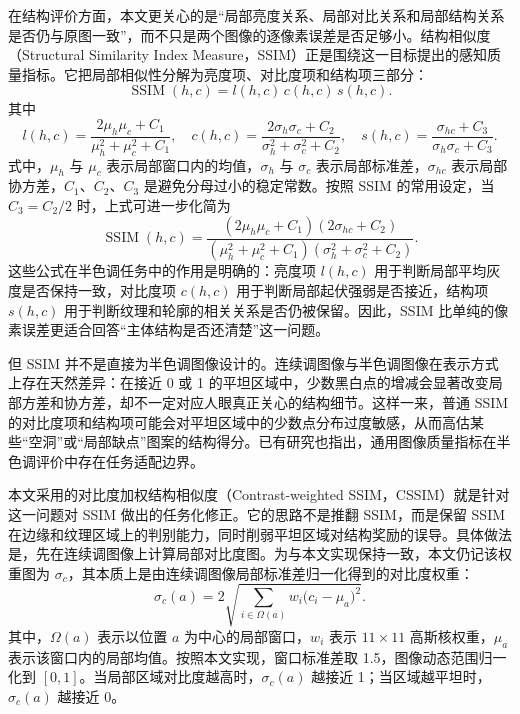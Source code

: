 \documentclass[thesis]{../zstucs-graduation-project}
\begin{document}
在结构评价方面，本文更关心的是“局部亮度关系、局部对比关系和局部结构关系是否仍与原图一致”，而不只是两个图像的逐像素误差是否足够小。结构相似度（Structural Similarity Index Measure，SSIM）正是围绕这一目标提出的感知质量指标\cite{WANG2004Image}。它把局部相似性分解为亮度项、对比度项和结构项三部分：
\begin{equation}
\operatorname{SSIM}(h,c)=l(h,c)\,c(h,c)\,s(h,c).
\label{eq:2-3}
\end{equation}
其中
\begin{equation}
l(h,c)=\frac{2\mu_h\mu_c+C_1}{\mu_h^2+\mu_c^2+C_1},\quad
c(h,c)=\frac{2\sigma_h\sigma_c+C_2}{\sigma_h^2+\sigma_c^2+C_2},\quad
s(h,c)=\frac{\sigma_{hc}+C_3}{\sigma_h\sigma_c+C_3}.
\label{eq:2-4}
\end{equation}
式中，$\mu_h$ 与 $\mu_c$ 表示局部窗口内的均值，$\sigma_h$ 与 $\sigma_c$ 表示局部标准差，$\sigma_{hc}$ 表示局部协方差，$C_1$、$C_2$、$C_3$ 是避免分母过小的稳定常数。按照 SSIM 的常用设定，当 $C_3=C_2/2$ 时，上式可进一步化简为
\begin{equation}
\operatorname{SSIM}(h,c)=
\frac{(2\mu_h\mu_c+C_1)(2\sigma_{hc}+C_2)}{(\mu_h^2+\mu_c^2+C_1)(\sigma_h^2+\sigma_c^2+C_2)}.
\label{eq:2-5}
\end{equation}
这些公式在半色调任务中的作用是明确的：亮度项 $l(h,c)$ 用于判断局部平均灰度是否保持一致，对比度项 $c(h,c)$ 用于判断局部起伏强弱是否接近，结构项 $s(h,c)$ 用于判断纹理和轮廓的相关关系是否仍被保留。因此，SSIM 比单纯的像素误差更适合回答“主体结构是否还清楚”这一问题。

但 SSIM 并不是直接为半色调图像设计的。连续调图像与半色调图像在表示方式上存在天然差异：在接近 0 或 1 的平坦区域中，少数黑白点的增减会显著改变局部方差和协方差，却不一定对应人眼真正关心的结构细节。这样一来，普通 SSIM 的对比度项和结构项可能会对平坦区域中的少数点分布过度敏感，从而高估某些“空洞”或“局部缺点”图案的结构得分。已有研究也指出，通用图像质量指标在半色调评价中存在任务适配边界\cite{ITOUA2010Objective}。

本文采用的对比度加权结构相似度（Contrast-weighted SSIM，CSSIM）就是针对这一问题对 SSIM 做出的任务化修正。它的思路不是推翻 SSIM，而是保留 SSIM 在边缘和纹理区域上的判别能力，同时削弱平坦区域对结构奖励的误导。具体做法是，先在连续调图像上计算局部对比度图。为与本文实现保持一致，本文仍记该权重图为 $\sigma_c$，其本质上是由连续调图像局部标准差归一化得到的对比度权重：
\begin{equation}
\sigma_c(a)=2\sqrt{\sum_{i\in\Omega(a)} w_i\bigl(c_i-\mu_a\bigr)^2}.
\label{eq:2-6}
\end{equation}
其中，$\Omega(a)$ 表示以位置 $a$ 为中心的局部窗口，$w_i$ 表示 $11\times11$ 高斯核权重，$\mu_a$ 表示该窗口内的局部均值。按照本文实现，窗口标准差取 1.5，图像动态范围归一化到 $[0,1]$。当局部区域对比度越高时，$\sigma_c(a)$ 越接近 1；当区域越平坦时，$\sigma_c(a)$ 越接近 0。
\end{document}

